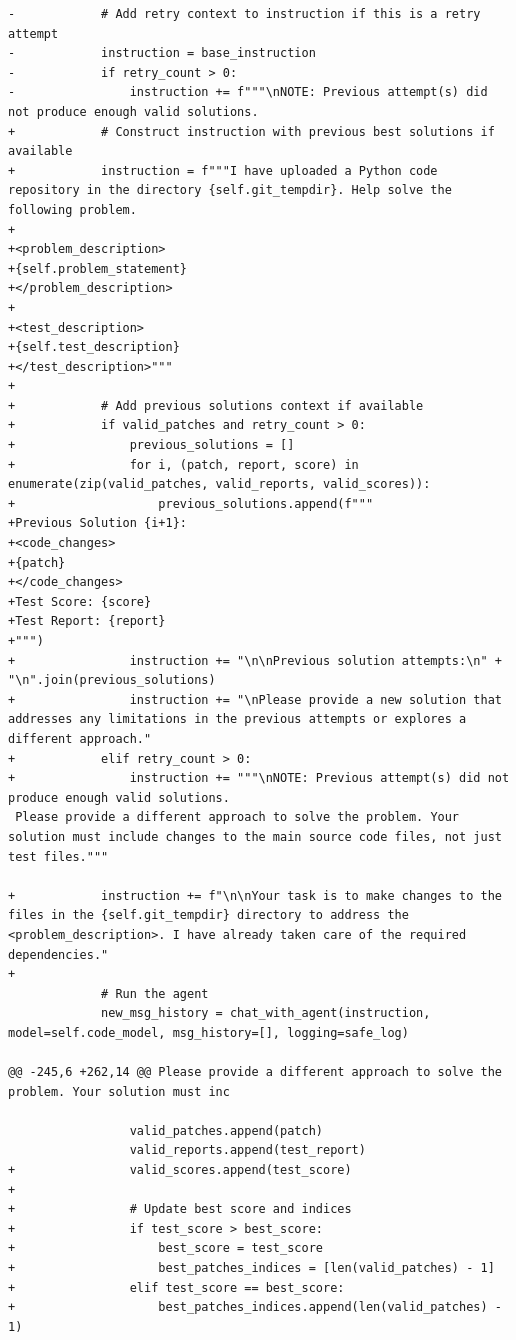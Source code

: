 \documentclass{article} %
\begin{document}
\begin{lstlisting}[style=diffstyle]
-            # Add retry context to instruction if this is a retry attempt
-            instruction = base_instruction
-            if retry_count > 0:
-                instruction += f"""\nNOTE: Previous attempt(s) did not produce enough valid solutions. 
+            # Construct instruction with previous best solutions if available
+            instruction = f"""I have uploaded a Python code repository in the directory {self.git_tempdir}. Help solve the following problem.
+
+<problem_description>
+{self.problem_statement}
+</problem_description>
+
+<test_description>
+{self.test_description}
+</test_description>"""
+
+            # Add previous solutions context if available
+            if valid_patches and retry_count > 0:
+                previous_solutions = []
+                for i, (patch, report, score) in enumerate(zip(valid_patches, valid_reports, valid_scores)):
+                    previous_solutions.append(f"""
+Previous Solution {i+1}:
+<code_changes>
+{patch}
+</code_changes>
+Test Score: {score}
+Test Report: {report}
+""")
+                instruction += "\n\nPrevious solution attempts:\n" + "\n".join(previous_solutions)
+                instruction += "\nPlease provide a new solution that addresses any limitations in the previous attempts or explores a different approach."
+            elif retry_count > 0:
+                instruction += """\nNOTE: Previous attempt(s) did not produce enough valid solutions. 
 Please provide a different approach to solve the problem. Your solution must include changes to the main source code files, not just test files."""
 
+            instruction += f"\n\nYour task is to make changes to the files in the {self.git_tempdir} directory to address the <problem_description>. I have already taken care of the required dependencies."
+
             # Run the agent
             new_msg_history = chat_with_agent(instruction, model=self.code_model, msg_history=[], logging=safe_log)
             
@@ -245,6 +262,14 @@ Please provide a different approach to solve the problem. Your solution must inc
 
                 valid_patches.append(patch)
                 valid_reports.append(test_report)
+                valid_scores.append(test_score)
+
+                # Update best score and indices
+                if test_score > best_score:
+                    best_score = test_score
+                    best_patches_indices = [len(valid_patches) - 1]
+                elif test_score == best_score:
+                    best_patches_indices.append(len(valid_patches) - 1)
 

\end{lstlisting}
\end{document}
